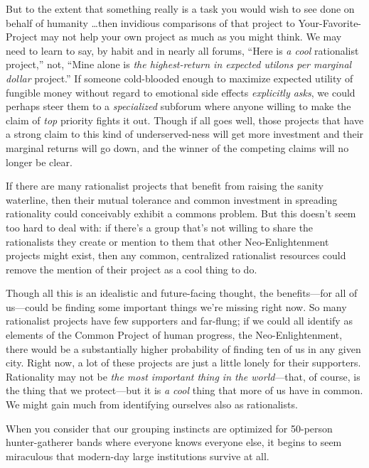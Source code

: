 {
 But to the extent that something really is a task you would wish
to see done on behalf of humanity \ldots then invidious comparisons of
that project to Your-Favorite-Project may not help your own project as
much as you might think. We may need to learn to say, by habit and in
nearly all forums, ``Here is \textit{a cool}
rationalist project,'' not, ``Mine
alone is \textit{the highest-return in expected utilons per marginal
dollar} project.'' If someone cold-blooded enough to
maximize expected utility of fungible money without regard to emotional
side effects \textit{explicitly asks}, we could perhaps steer them to a
\textit{specialized} subforum where anyone willing to make the claim of
\textit{top} priority fights it out. Though if all goes well, those
projects that have a strong claim to this kind of underserved-ness will
get more investment and their marginal returns will go down, and the
winner of the competing claims will no longer be clear.}

{
 If there are many rationalist projects that benefit from raising
the sanity waterline, then their mutual tolerance and common investment
in spreading rationality could conceivably exhibit a commons problem.
But this doesn't seem too hard to deal with: if
there's a group that's not willing to
share the rationalists they create or mention to them that other
Neo-Enlightenment projects might exist, then any common, centralized
rationalist resources could remove the mention of their project as a
cool thing to do.}

{
 Though all this is an idealistic and future-facing thought, the
benefits---for all of us---could be finding some important things
we're missing right now. So many rationalist projects
have few supporters and far-flung; if we could all identify as elements
of the Common Project of human progress, the Neo-Enlightenment, there
would be a substantially higher probability of finding ten of us in any
given city. Right now, a lot of these projects are just a little lonely
for their supporters. Rationality may not be \textit{the most important
thing in the world}{}---that, of course, is the thing that we
protect---but it is \textit{a cool} thing that more of us have in
common. We might gain much from identifying ourselves also as
rationalists.}

\myendsectiontext


{
 When you consider that our grouping instincts are optimized for
50-person hunter-gatherer bands where everyone knows everyone else, it
begins to seem miraculous that modern-day large institutions survive at
all. }

